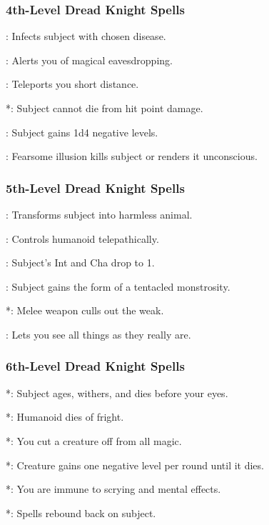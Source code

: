 \subsubsection{4th-Level Dread Knight Spells}
\begin{list}{}{\leftmargin=1em}
\item {}: Infects subject with chosen disease.
\item {}: Alerts you of magical eavesdropping.
\item {}: Teleports you short distance.
\item {}*: Subject cannot die from hit point damage.
\item {}: Subject gains 1d4 negative levels.
\item {}: Fearsome illusion kills subject or renders it unconscious.
\end{list}
\subsubsection{5th-Level Dread Knight Spells}
\begin{list}{}{\leftmargin=1em}
\item {}: Transforms subject into harmless animal.
\item {}: Controls humanoid telepathically.
\item {}: Subject's Int and Cha drop to 1.
\item {}: Subject gains the form of a tentacled monstrosity.
\item {}*: Melee weapon culls out the weak.
\item {}: Lets you see all things as they really are.
\end{list}
\subsubsection{6th-Level Dread Knight Spells}
\begin{list}{}{\leftmargin=1em}
\item {}*: Subject ages, withers, and dies before your eyes.
\item {}*: Humanoid dies of fright.
\item {}*: You cut a creature off from all magic.
\item {}*: Creature gains one negative level per round until it dies.
\item {}*: You are immune to scrying and mental effects.
\item {}*: Spells rebound back on subject.
\end{list}

